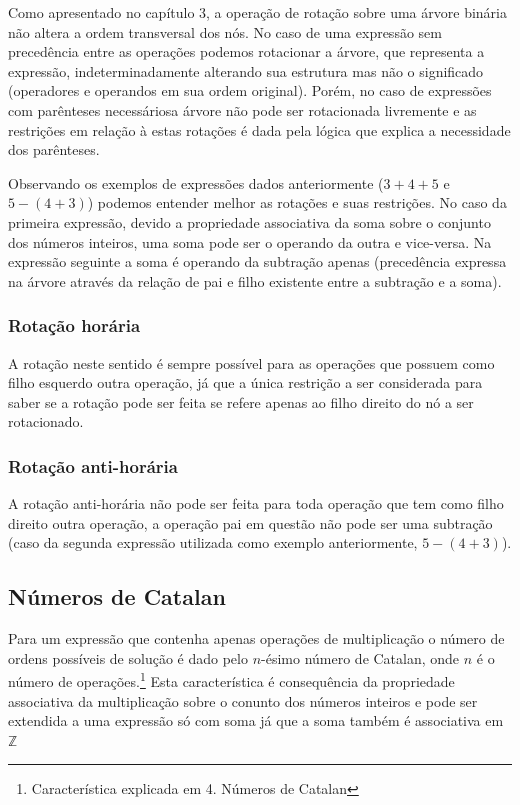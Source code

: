 Como apresentado no capítulo 3, a operação de rotação sobre uma árvore binária não altera a ordem transversal dos nós. No caso de uma expressão sem precedência entre as operações podemos rotacionar a árvore, que representa a expressão, indeterminadamente alterando sua estrutura mas não o significado (operadores e operandos em sua ordem original). Porém, no caso de expressões com parênteses necessáriosa árvore não pode ser rotacionada livremente e as restrições em relação à estas rotações é dada pela lógica que explica a necessidade dos parênteses.

Observando os exemplos de expressões dados anteriormente ($3+4+5$ e $5-(4+3)$) podemos entender melhor as rotações e suas restrições. No caso da primeira expressão, devido a propriedade associativa da soma sobre o conjunto dos números inteiros, uma soma pode ser o operando da outra e vice-versa. Na expressão seguinte a soma é operando da subtração apenas (precedência expressa na árvore através da relação de pai e filho existente entre a subtração e a soma).

\subsubsection{Rotação horária}
	A rotação neste sentido é sempre possível para as operações que possuem como filho esquerdo outra operação, já que a única restrição a ser considerada para saber se a rotação pode ser feita se refere apenas ao filho direito do nó a ser rotacionado.
	
\subsubsection{Rotação anti-horária}
	A rotação anti-horária não pode ser feita para toda operação que tem como filho direito outra operação, a operação pai em questão não pode ser uma subtração (caso da segunda expressão utilizada como exemplo anteriormente, $5-(4+3)$).
	
\subsection{Números de Catalan}
Para um expressão que contenha apenas operações de multiplicação o número de ordens possíveis de solução é dado pelo $n$-ésimo número de Catalan, onde $n$ é o número de operações.\footnote{Característica explicada em 4. Números de Catalan} Esta característica é consequência da propriedade associativa da multiplicação sobre o conunto dos números inteiros e pode ser extendida a uma expressão só com soma já que a soma também é associativa em $\mathbb{Z}$

